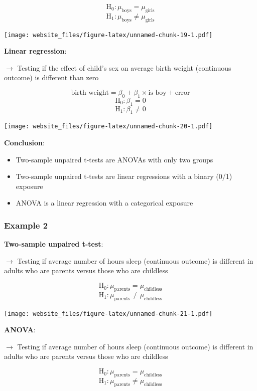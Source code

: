 \documentclass[12pt,]{article}
\providecommand{\tightlist}{%
  \setlength{\itemsep}{0pt}\setlength{\parskip}{0pt}}
\begin{document}
\[\text{H}_0: \mu_{\text{boys}} = \mu_{\text{girls}}\]
\[\text{H}_1: \mu_{\text{boys}} \ne \mu_{\text{girls}}\]

\texttt{[image: website\_files/figure-latex/unnamed-chunk-19-1.pdf]}

\newpage

\textbf{Linear regression}:

\(\rightarrow\) Testing if the effect of child's sex on average birth
weight (continuous outcome) is different than zero

\[\text{birth weight} = \beta_0 + \beta_1 \times \text{is boy} + \text{error}\]
\[\text{H}_0: \beta_1 = 0\] \[\text{H}_1: \beta_1 \ne 0\]

\texttt{[image: website\_files/figure-latex/unnamed-chunk-20-1.pdf]}

\textbf{Conclusion}:

\begin{itemize}
\tightlist
\item
  Two-sample unpaired t-tests are ANOVAs with only two groups
\item
  Two-sample unpaired t-tests are linear regressions with a binary (0/1)
  exposure
\item
  ANOVA is a linear regression with a categorical exposure
\end{itemize}

\newpage

\subsubsection{Example 2}\label{example-2-5}

\textbf{Two-sample unpaired t-test}:

\(\rightarrow\) Testing if average number of hours sleep (continuous
outcome) is different in adults who are parents versus those who are
childless

\[\text{H}_0: \mu_{\text{parents}} = \mu_{\text{childless}}\]
\[\text{H}_1: \mu_{\text{parents}} \ne \mu_{\text{childless}}\]

\texttt{[image: website\_files/figure-latex/unnamed-chunk-21-1.pdf]}

\newpage

\textbf{ANOVA}:

\(\rightarrow\) Testing if average number of hours sleep (continuous
outcome) is different in adults who are parents versus those who are
childless

\[\text{H}_0: \mu_{\text{parents}} = \mu_{\text{childless}}\]
\[\text{H}_1: \mu_{\text{parents}} \ne \mu_{\text{childless}}\]
\end{document}
